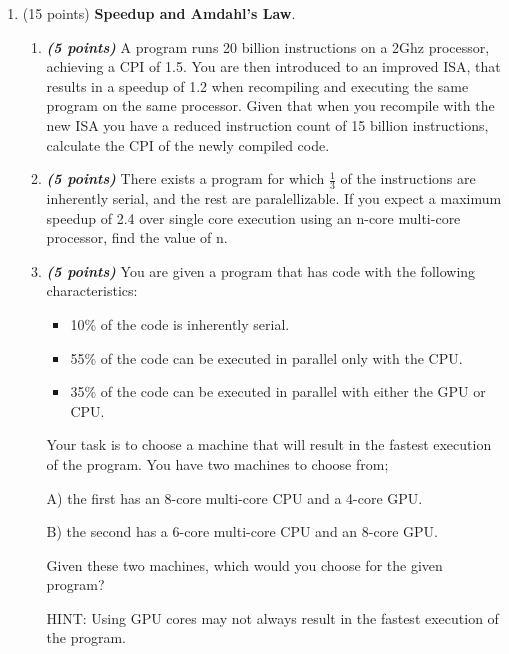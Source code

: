 \documentclass[a4paper,10pt]{article}
\begin{document}
\begin{enumerate}
\begin{comment}
    QUESTION 1
\end{comment}
\item (15 points) \textbf{Speedup and Amdahl's Law}. 

\begin{enumerate}
    \item \textbf{\textit{(5 points)}} A program runs 20 billion instructions on a 2Ghz processor, achieving a CPI of 1.5. You are then introduced to an improved ISA, that results in a speedup of 1.2 when recompiling and executing the same program on the same processor. Given that when you recompile with the new ISA you have a reduced instruction count of 15 billion instructions, calculate the CPI of the newly compiled code.
    
    \item \textbf{\textit{(5 points)}} There exists a program for which $\frac{1}{3}$ of the instructions are inherently serial, and the rest are paralellizable. If you expect a maximum speedup of 2.4 over single core execution using an n-core multi-core processor, find the value of n.
    
    \item \textbf{\textit{(5 points)}} You are given a program that has code with the following characteristics:
    \begin{itemize}
        \item 10\% of the code is inherently serial.
        \item 55\% of the code can be executed in parallel only with the CPU.
        \item 35\% of the code can be executed in parallel with either the GPU or CPU.
    \end{itemize}
    Your task is to choose a machine that will result in the fastest execution of the program. You have two machines to choose from; 
    
    A) the first has an 8-core multi-core CPU and a 4-core GPU.
    
    B) the second has a 6-core multi-core CPU and an 8-core GPU. 
    
    Given these two machines, which would you choose for the given program?

    HINT: Using GPU cores may not always result in the fastest execution of the program.
    
\end{enumerate}


\end{enumerate}
\end{document}
